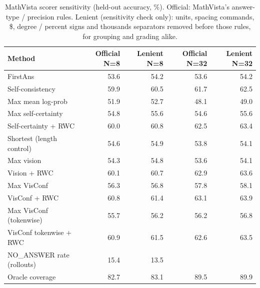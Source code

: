 \begin{table}[t]
\centering
\small
\caption{MathVista scorer sensitivity (held-out accuracy, \%). Official: MathVista's answer-type / precision rules. Lenient (sensitivity check only): units, spacing commands, \$, degree / percent signs and thousands separators removed before those rules, for grouping and grading alike.}
\label{tab:t3-sensitivity}
\begin{tabular}{lrrrr}
\toprule
Method & Official N=8 & Lenient N=8 & Official N=32 & Lenient N=32 \\
\midrule
FirstAns & 53.6 & 54.2 & 53.6 & 54.2 \\
Self-consistency & 59.9 & 60.5 & 61.7 & 62.5 \\
Max mean log-prob & 51.9 & 52.7 & 48.1 & 49.0 \\
Max self-certainty & 54.8 & 55.6 & 54.6 & 55.6 \\
Self-certainty + RWC & 60.0 & 60.8 & 62.5 & 63.4 \\
Shortest (length control) & 54.6 & 54.9 & 53.8 & 54.1 \\
Max vision & 54.3 & 54.8 & 53.6 & 54.1 \\
Vision + RWC & 60.1 & 60.7 & 62.9 & 63.6 \\
Max VisConf & 56.3 & 56.8 & 57.8 & 58.1 \\
VisConf + RWC & 60.8 & 61.4 & 63.1 & 63.9 \\
Max VisConf (tokenwise) & 55.7 & 56.2 & 56.2 & 56.8 \\
VisConf tokenwise + RWC & 60.9 & 61.5 & 62.6 & 63.5 \\
NO\_ANSWER rate (rollouts) & 15.4 & 13.5 &  &  \\
Oracle coverage & 82.7 & 83.1 & 89.5 & 89.9 \\
\bottomrule
\end{tabular}
\end{table}
